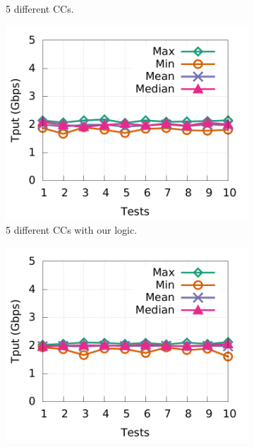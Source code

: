 \begin{figure}[!htb]
\begin{subfigure}[b]{0.24\textwidth}
                \caption{5 different CCs.}
                \label{fairness_5CC}
        \end{subfigure}
        \begin{subfigure}[b]{0.24\textwidth}
                \centering
                \includegraphics[width=\textwidth]{figures/tput_fairness/liquid_5CC_tput.pdf}
                \caption{5 different CCs with our logic.}
                \label{fairness_5CC_with_ours}
        \end{subfigure}
        \begin{subfigure}[b]{0.24\textwidth}
                \centering
                \includegraphics[width=\textwidth]{figures/tput_fairness/ecn_all_dctcp_tput.pdf}

\end{subfigure}
\end{figure}
